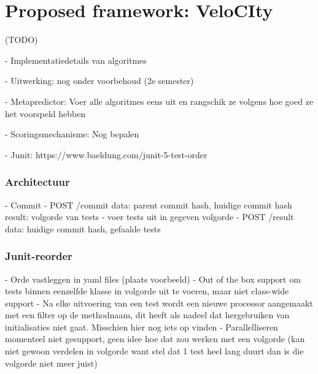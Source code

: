 \chapter{Proposed framework: VeloCIty}
\label{chap:velocity}
(TODO)

- Implementatiedetails van algoritmes

- Uitwerking: nog onder voorbehoud (2e semester)

- Metapredictor: Voer alle algoritmes eens uit en rangschik ze volgens hoe goed ze het voorspeld hebben

- Scoringsmechanisme: Nog bepalen

- Junit: https://www.baeldung.com/junit-5-test-order

\subsection{Architectuur}
- Commit
- POST /commit
	data: parent commit hash, huidige commit hash
	result: volgorde van tests
- voer tests uit in gegeven volgorde
- POST /result
	data: huidige commit hash, gefaalde tests
	
\subsection{Junit-reorder}
- Orde vastleggen in yaml files (plaats voorbeeld)
- Out of the box support om tests binnen eenzelfde klasse in volgorde uit te voeren, maar niet class-wide support
- Na elke uitvoering van een test wordt een nieuwe processor aangemaakt met een filter op de methodnaam, dit heeft als nadeel dat hergebruiken van initialisaties niet gaat. Misschien hier nog iets op vinden
- Parallelliseren momenteel niet gesupport, geen idee hoe dat zou werken met een volgorde (kan niet gewoon verdelen in volgorde want stel dat 1 test heel lang duurt dan is die volgorde niet meer juist)
